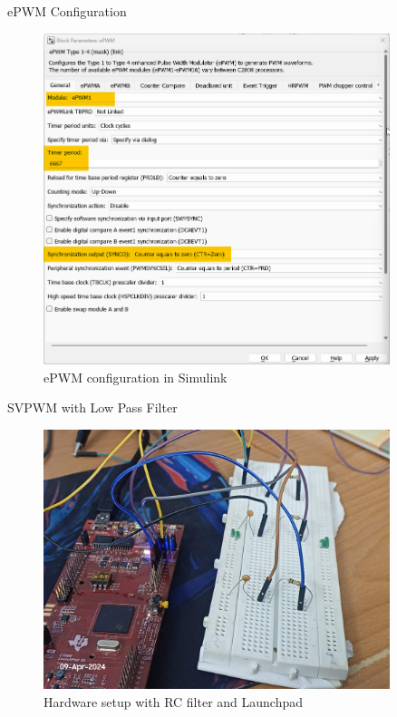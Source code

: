 \begin{frame}{ePWM Configuration}
	\begin{figure}
		\centering
		\includegraphics[width=0.9\textwidth]{sections/section6/images/SVPWM/ePWMTBPRD.png}
		\caption{ePWM configuration in Simulink}
	\end{figure}
\end{frame}

\begin{frame}{SVPWM with Low Pass Filter}
	\begin{figure}
		\centering
		\includegraphics[width=0.9\textwidth]{sections/section6/images/SVPWM/LPFandC2000.jpg}
		\caption{Hardware setup with RC filter and Launchpad}
	\end{figure}
\end{frame}

